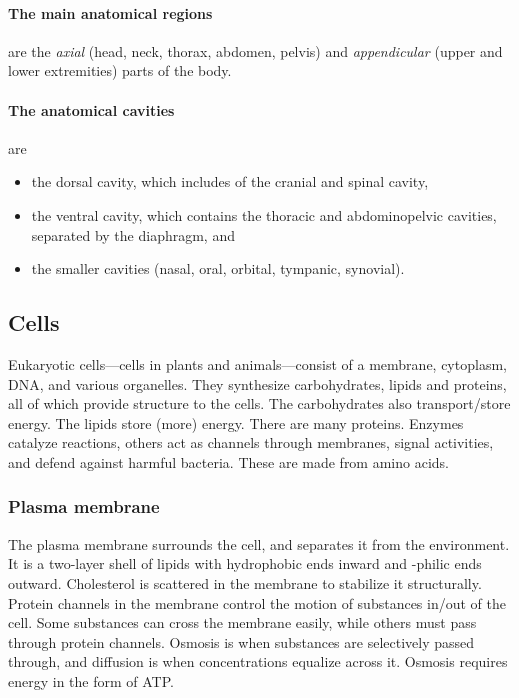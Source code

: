 \paragraph{The main anatomical regions} are the \emph{axial} (head, neck, thorax, abdomen, pelvis) and \emph{appendicular} (upper and lower extremities) parts of the body.

\paragraph{The anatomical cavities} are
\begin{itemize}
    \item the dorsal cavity, which includes of the cranial and spinal cavity,
    \item the ventral cavity, which contains the thoracic and abdominopelvic cavities, separated by the diaphragm, and
    \item the smaller cavities (nasal, oral, orbital, tympanic, synovial).
\end{itemize}

\subsection{Cells}
Eukaryotic cells---cells in plants and animals---consist of a membrane, cytoplasm, DNA, and various organelles. They synthesize carbohydrates, lipids and proteins, all of which provide structure to the cells. The carbohydrates also transport/store energy. The lipids store (more) energy. There are many proteins. Enzymes catalyze reactions, others act as channels through membranes, signal activities, and defend against harmful bacteria. These are made from amino acids.

\subsubsection{Plasma membrane}
The plasma membrane surrounds the cell, and separates it from the environment. It is a two-layer shell of lipids with hydrophobic ends inward and -philic ends outward. Cholesterol is scattered in the membrane to stabilize it structurally. Protein channels in the membrane control the motion of substances in/out of the cell. Some substances can cross the membrane easily, while others must pass through protein channels. Osmosis is when substances are selectively passed through, and diffusion is when concentrations equalize across it. Osmosis requires energy in the form of ATP.

